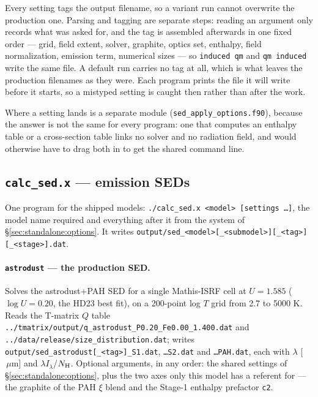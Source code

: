 \documentclass{my_memo}
\newcommand{\code}[1]{\texttt{#1}}
\newcommand{\lamIlam}{\ensuremath{\lambda I_\lambda}}
\newcommand{\Nh}{\ensuremath{N_{\rm H}}}
\newcommand{\um}{\ensuremath{\,\mu\mathrm{m}}}
\begin{document}
Every setting tags the output filename, so a variant run cannot overwrite the
production one. Parsing and tagging are separate steps: reading an argument only
records what was asked for, and the tag is assembled afterwards in one fixed
order --- grid, field extent, solver, graphite, optics set, enthalpy, field
normalization, emission term, numerical sizes --- so \code{induced qm} and
\code{qm induced} write the same file. A default run carries no tag at all,
which is what leaves the production filenames as they were. Each program prints
the file it will write before it starts, so a mistyped setting is caught then
rather than after the work.

Where a setting lands is a separate module (\code{sed\_apply\_options.f90}),
because the answer is not the same for every program: one that computes an
enthalpy table or a cross-section table links no solver and no radiation field,
and would otherwise have to drag both in to get the shared command line.

\subsection{\code{calc\_sed.x} --- emission SEDs}\label{sec:standalone:sed}

One program for the shipped models: \code{./calc\_sed.x <model>
[settings \ldots]}, the model name required and everything after it from the
system of \S\ref{sec:standalone:options}. It writes
\code{output/sed\_<model>[\_<submodel>][\_<tag>][\_<stage>].dat}.

\paragraph{\code{astrodust} --- the production SED.} Solves the astrodust+PAH SED for a single Mathis-ISRF cell at $U = 1.585$
($\log U = 0.20$, the HD23 best fit), on a 200-point log $T$ grid from 2.7 to
5000 K. Reads the T-matrix $Q$ table
\code{../tmatrix/output/q\_astrodust\_P0.20\_Fe0.00\_1.400.dat} and
\code{../data/release/size\_distribution.dat}; writes
\code{output/sed\_astrodust[\_<tag>]\_S1.dat}, \code{\ldots S2.dat} and
\code{\ldots PAH.dat}, each with $\lambda$ [\um] and \lamIlam/\Nh.
Optional arguments, in any order: the shared settings of
\S\ref{sec:standalone:options}, plus the two axes only this model has a referent
for --- the graphite of the PAH $\xi$ blend and the Stage-1 enthalpy prefactor
\code{c2}.
\end{document}
